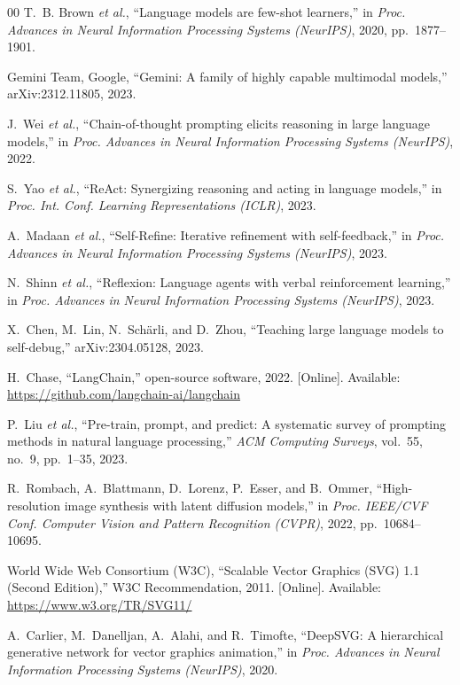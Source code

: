 \documentclass[conference]{IEEEtran}
\begin{document}
\begin{thebibliography}{00}
 T.~B. Brown \emph{et al.}, ``Language models are
few-shot learners,'' in \emph{Proc. Advances in Neural Information Processing
Systems (NeurIPS)}, 2020, pp.~1877--1901.

 Gemini Team, Google, ``Gemini: A family of highly capable
multimodal models,'' arXiv:2312.11805, 2023.

 J.~Wei \emph{et al.}, ``Chain-of-thought prompting elicits
reasoning in large language models,'' in \emph{Proc. Advances in Neural
Information Processing Systems (NeurIPS)}, 2022.

 S.~Yao \emph{et al.}, ``ReAct: Synergizing reasoning and
acting in language models,'' in \emph{Proc. Int. Conf. Learning Representations
(ICLR)}, 2023.

 A.~Madaan \emph{et al.}, ``Self-Refine: Iterative
refinement with self-feedback,'' in \emph{Proc. Advances in Neural Information
Processing Systems (NeurIPS)}, 2023.

 N.~Shinn \emph{et al.}, ``Reflexion: Language
agents with verbal reinforcement learning,'' in \emph{Proc. Advances in Neural
Information Processing Systems (NeurIPS)}, 2023.

 X.~Chen, M.~Lin, N.~Sch\"arli, and D.~Zhou,
``Teaching large language models to self-debug,'' arXiv:2304.05128, 2023.

 H.~Chase, ``LangChain,'' open-source software, 2022.
[Online]. Available: \url{https://github.com/langchain-ai/langchain}

 P.~Liu \emph{et al.}, ``Pre-train, prompt, and
predict: A systematic survey of prompting methods in natural language
processing,'' \emph{ACM Computing Surveys}, vol.~55, no.~9, pp.~1--35, 2023.

 R.~Rombach, A.~Blattmann, D.~Lorenz, P.~Esser, and
B.~Ommer, ``High-resolution image synthesis with latent diffusion models,'' in
\emph{Proc. IEEE/CVF Conf. Computer Vision and Pattern Recognition (CVPR)},
2022, pp.~10684--10695.

 World Wide Web Consortium (W3C), ``Scalable Vector Graphics
(SVG) 1.1 (Second Edition),'' W3C Recommendation, 2011. [Online]. Available:
\url{https://www.w3.org/TR/SVG11/}

 A.~Carlier, M.~Danelljan, A.~Alahi, and
R.~Timofte, ``DeepSVG: A hierarchical generative network for vector graphics
animation,'' in \emph{Proc. Advances in Neural Information Processing Systems
(NeurIPS)}, 2020.


\end{thebibliography}
\end{document}

